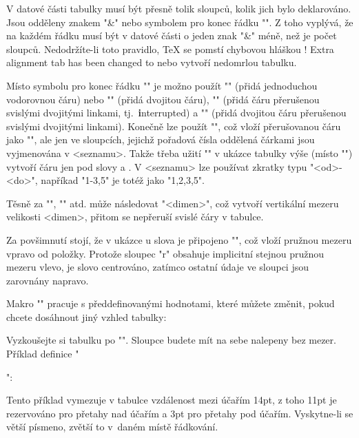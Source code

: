 V datové části tabulky musí být přesně tolik sloupců, kolik jich bylo deklarováno.
Jsou odděleny znakem "&" nebo symbolem pro konec řádku "\cr". Z toho vyplývá,
že na každém řádku musí být v datové části o jeden znak "&" méně, než je počet sloupců.
Nedodržíte-li toto pravidlo, \TeX{} se pomstí chybovou hláškou
\begtt
! Extra alignment tab has been changed to \cr
\endtt  
%
nebo vytvoří nedomrlou tabulku. 

Místo symbolu pro konec řádku "\cr" je možno
použít "\crl" (přidá jednoduchou vodorovnou čáru) nebo "\crll" (přidá dvojitou
čáru), "\crli" (přidá čáru přerušenou svislými dvojitými linkami, 
tj.~{\bf i}nterrupted) a 
"\crlli" (přidá dvojitou čáru přerušenou svislými dvojitými linkami).
Konečně lze použít "", což vloží přerušovanou čáru jako
"\crli", ale jen ve sloupcích, jejichž pořadová čísla oddělená čárkami 
jsou vyjmenována v <seznamu>. Takže třeba užití "" v ukázce tabulky výše
(místo "\crli") vytvoří čáru jen pod slovy  a . V
<seznamu> lze používat zkratky typu "<od>-<do>", napříkad "1-3,5" je totéž jako
"1,2,3,5".

Těsně za "\cr", "\crl" atd. může následovat "\tskip<dimen>",
což vytvoří vertikální mezeru velikosti <dimen>, přitom se nepřeruší svislé
čáry v tabulce.

Za povšimnutí stojí, že v ukázce u slova  je připojeno
"\hfil", což vloží pružnou mezeru vpravo od položky. Protože sloupec "r"
obsahuje implicitní stejnou pružnou mezeru vlevo, je slovo  centrováno, 
zatímco ostatní údaje ve sloupci jsou zarovnány
napravo. 

Makro "\table" pracuje s předdefinovanými hodnotami, které můžete změnit,
pokud chcete dosáhnout jiný vzhled tabulky:

\begtt
\def\tabiteml{\enspace} %
\def\tabitemr{\enspace} %
\def\tabstrut{\strut}   %
\def\vvkern{1pt}   %
\def\hhkern{1pt}   %
\endtt

Vyzkoušejte si tabulku po "\def\tabiteml{}\def\tabitemr{}". Sloupce budete
mít na sebe nalepeny bez mezer. Příklad definice "\tabstrut": 

\begtt
\def\tabstrut{\vrule height11pt depth3pt width0pt}
\endtt
%
Tento příklad vymezuje v tabulce vzdálenost mezi účařím 14pt, z toho
11pt je rezervováno pro přetahy nad účařím a 3pt pro přetahy pod
účařím. Vyskytne-li se větší písmeno, zvětší to v~daném místě řádkování.

